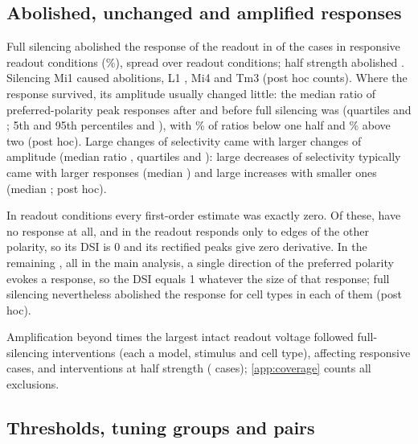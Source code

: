 \subsection{Abolished, unchanged and amplified responses}
\label{sec:abolition}

Full silencing abolished the response of the readout in \AbolishedFull{} of the \ResponsiveCases{} cases in responsive readout conditions (\AbolishedFullPct\%), spread over \AbolitionReadoutsFull{} readout conditions; half strength abolished \AbolishedHalf{}. Silencing Mi1 caused \AbolishedByMiOne{} abolitions, L1 \AbolishedByLOne{}, Mi4 \AbolishedByMiFour{} and Tm3 \AbolishedByTmThree{} (post hoc counts). Where the response survived, its amplitude usually changed little: the median ratio of preferred-polarity peak responses after and before full silencing was \AmpRatioMedian{} (quartiles \AmpRatioQOne{} and \AmpRatioQThree{}; 5th and 95th percentiles \AmpRatioLowQ{} and \AmpRatioHighQ{}), with \AmpRatioBelowHalfPct\% of ratios below one half and \AmpRatioAboveTwoPct\% above two (post hoc). Large changes of selectivity came with larger changes of amplitude (median ratio \AmpRatioLargeMedian{}, quartiles \AmpRatioLargeQOne{} and \AmpRatioLargeQThree{}): large decreases of selectivity typically came with larger responses (median \AmpRatioLargeDecMedian{}) and large increases with smaller ones (median \AmpRatioLargeIncMedian{}; post hoc).

In \ZeroGradReadouts{} readout conditions every first-order estimate was exactly zero. Of these, \Unresponsive{} have no response at all, and in \ZeroGradResponsiveSilent{} the readout responds only to edges of the other polarity, so its DSI is 0 and its rectified peaks give zero derivative. In the remaining \ZeroGradSelective{}, all in the main analysis, a single direction of the preferred polarity evokes a response, so the DSI equals 1 whatever the size of that response; full silencing nevertheless abolished the response for \ZeroGradAbolitionsRange{} cell types in each of them (post hoc).

Amplification beyond \AmpLimit{} times the largest intact readout voltage followed \AmplifiedInterventionsFull{} full-silencing interventions (each a model, stimulus and cell type), affecting \AmplifiedCasesFull{} responsive cases, and \AmplifiedInterventionsHalf{} interventions at half strength (\AmplifiedCasesHalf{} cases); \cref{app:coverage} counts all exclusions.

\subsection{Thresholds, tuning groups and pairs}
\label{sec:robustness}

